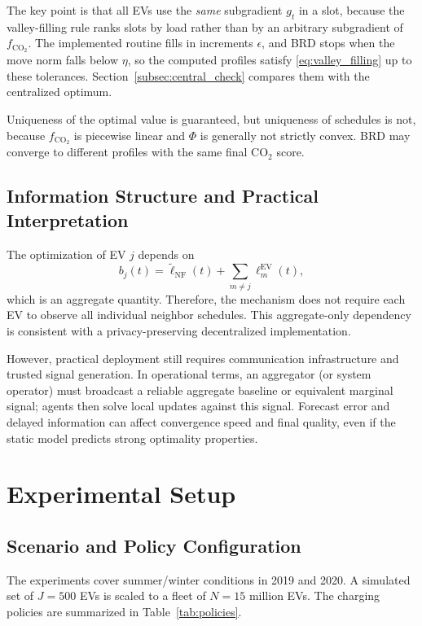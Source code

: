 \documentclass[11pt]{article}
\begin{document}
The key point is that all EVs use the \emph{same} subgradient $g_t$ in a slot, because the valley-filling rule ranks slots by load rather than by an arbitrary subgradient of $f_{\mathrm{CO}_2}$. The implemented routine fills in increments $\epsilon$, and BRD stops when the move norm falls below $\eta$, so the computed profiles satisfy \eqref{eq:valley_filling} up to these tolerances. Section~\ref{subsec:central_check} compares them with the centralized optimum.

Uniqueness of the optimal value is guaranteed, but uniqueness of schedules is not, because $f_{\mathrm{CO}_2}$ is piecewise linear and $\Phi$ is generally not strictly convex. BRD may converge to different profiles with the same final CO$_2$ score.

\subsection{Information Structure and Practical Interpretation}
\label{subsec:information_structure}

The optimization of EV $j$ depends on
\[
b_j(t)=\tilde \ell_{\mathrm{NF}}(t)+\sum_{m\ne j}\ell_m^{\mathrm{EV}}(t),
\]
which is an aggregate quantity. Therefore, the mechanism does not require each EV to observe all individual neighbor schedules. This aggregate-only dependency is consistent with a privacy-preserving decentralized implementation.

However, practical deployment still requires communication infrastructure and trusted signal generation. In operational terms, an aggregator (or system operator) must broadcast a reliable aggregate baseline or equivalent marginal signal; agents then solve local updates against this signal. Forecast error and delayed information can affect convergence speed and final quality, even if the static model predicts strong optimality properties.

\section{Experimental Setup}
\label{sec:setup}

\subsection{Scenario and Policy Configuration}
\label{subsec:scenario_policy}

The experiments cover summer/winter conditions in 2019 and 2020. A simulated set of $J=500$ EVs is scaled to a fleet of $N=15$ million EVs. The charging policies are summarized in Table~\ref{tab:policies}.
\end{document}
